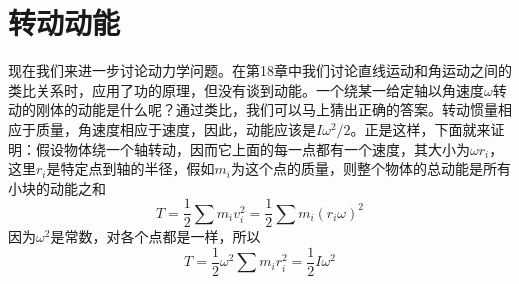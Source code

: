 \begin{table}[H]
    \footnotesize
    \centering
    \caption{}
    \label{Table:19:2}
\end{table}

\section{转动动能}

现在我们来进一步讨论动力学问题。在第18章中我们讨论直线运动和角运动之间的类比关系时，应用了功的原理，但没有谈到动能。一个绕某一给定轴以角速度$\omega$转动的刚体的动能是什么呢？通过类比，我们可以马上猜出正确的答案。转动惯量相应于质量，角速度相应于速度，因此，动能应该是$I\omega^2/2$。正是这样，下面就来证明：假设物体绕一个轴转动，因而它上面的每一点都有一个速度，其大小为$\omega r_i$，这里$r_i$是特定点到轴的半径，假如$m_i$为这个点的质量，则整个物体的总动能是所有小块的动能之和
\begin{equation*}
    T = \frac{1}{2} \sum m_iv_i^2 = \frac{1}{2} \sum m_i(r_i\omega)^2
\end{equation*}
因为$\omega^2$是常数，对各个点都是一样，所以
\begin{equation}
    \label{Eq:I:19:8}
    T = \frac{1}{2}\omega^2 \sum m_ir_i^2 = \frac{1}{2} I\omega^2
\end{equation}

